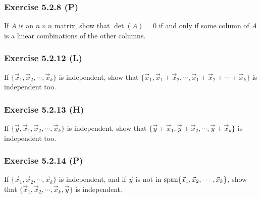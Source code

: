 \documentclass[pdf,9pt,t]{beamer}
\begin{document}
\begin{frame}[fragile]
    \frametitle{Exercise 5.2.8 (P)}
    \begin{problem}
	If $A$ is an $n\times n$ matrix, show that $\det(A)=0$ if and only if some column of $A$ is a linear combinations of the other columns.
    \end{problem}

\end{frame}
\begin{frame}[fragile]
    \frametitle{Exercise 5.2.12 (L)}
    \begin{problem}
	If $\{\vec{x}_1,\vec{x}_2,\cdots,\vec{x}_k\}$ is independent, show that
	$\{\vec{x}_1,\vec{x}_1+\vec{x}_2,\cdots,\vec{x}_1+\vec{x}_2+\cdots+\vec{x}_k\}$ is independent too.
    \end{problem}

\end{frame}
\begin{frame}[fragile]
    \frametitle{Exercise 5.2.13 (H)}
    \begin{problem}
	If $\{\vec{y}, \vec{x}_1,\vec{x}_2,\cdots,\vec{x}_k\}$ is independent, show that
	$\{\vec{y}+\vec{x}_1,\vec{y}+\vec{x}_2,\cdots,\vec{y}+\vec{x}_k\}$ is independent too.
    \end{problem}

\end{frame}
\begin{frame}[fragile]
    \frametitle{Exercise 5.2.14 (P)}
    \begin{problem}
	If $\{\vec{x}_1,\vec{x}_2,\cdots,\vec{x}_k\}$ is independent,
	and if $\vec{y}$ is not in $\mbox{span}\{\vec{x}_1,\vec{x}_2,\cdots,\vec{x}_k\}$,
	show that $\{\vec{x}_1,\vec{x}_2,\cdots,\vec{x}_k,\vec{y}\}$ is independent.
    \end{problem}

\end{frame}
\end{document}
